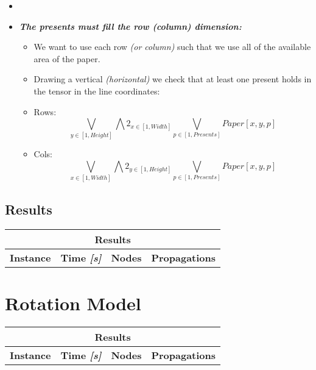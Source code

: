 \begin{itemize}
    \item \textbf{\textit{}}
    \item \textbf{\textit{The presents must fill the row (column) dimension:}}
        \begin{itemize}
            \item[] We want to use each row \textit{(or column)} such that we use all of the available area of the paper.
            \item[] Drawing a vertical \textit{(horizontal)} we check that at least one present holds in the tensor in the line coordinates:
            \item[] Rows: \begin{equation*}\bigvee_{y \in [1, Height]} \bigwedge2_{x \in [1, Width]} \bigvee_{p \in [1, Presents]} Paper[x, y, p]\end{equation*}
            \item[] Cols: \begin{equation*}\bigvee_{x \in [1, Width]} \bigwedge2_{y \in [1, Height]} \bigvee_{p \in [1, Presents]} Paper[x, y, p]\end{equation*}
        \end{itemize}
\end{itemize}

\subsection{Results}
\begin{center}
    \begin{tabular}{|c|c|c|c|}
        \hline
        \multicolumn{4}{|c|}{\textbf{Results}} \\
        \hline
        \textbf{Instance} & \textbf{Time \textit{[s]}} & \textbf{Nodes} & \textbf{Propagations} \\
        \hline
    \end{tabular}
\end{center}

\section{Rotation Model}

\begin{center}
    \begin{tabular}{|c|c|c|c|}
        \hline
        \multicolumn{4}{|c|}{\textbf{Results}} \\
        \hline
        \textbf{Instance} & \textbf{Time \textit{[s]}} & \textbf{Nodes} & \textbf{Propagations} \\
        \hline
    \end{tabular}
\end{center}

